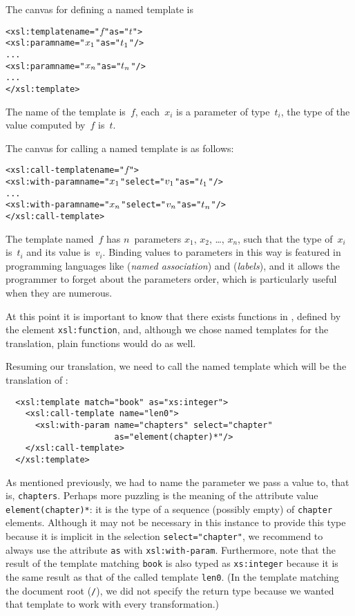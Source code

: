 The canvas for defining a named template is
\begin{alltt}
<xsl:template name="\(f\)" as="\(t\)">
  <xsl:param name="\(x\sb{1}\)" as="\(t\sb{1}\)"/>
  ...
  <xsl:param name="\(x\sb{n}\)" as="\(t\sb{n}\)"/>
  ...
</xsl:template>
\end{alltt}
The name of the template is~\(f\), each~\(x_i\) is a parameter of
type~\(t_i\), the type of the value computed by~\(f\) is~\(t\).

The canvas for calling a named template is as follows:
\begin{alltt}
<xsl:call-template name="\(f\)">
  <xsl:with-param name="\(x\sb{1}\)" select="\(v\sb{1}\)" as="\(t\sb{1}\)"/>
  ...
  <xsl:with-param name="\(x\sb{n}\)" select="\(v\sb{n}\)" as="\(t\sb{n}\)"/>
</xsl:call-template>
\end{alltt}
The template named~\(f\) has \(n\)~parameters \(x_1\), \(x_2\),
\ldots, \(x_n\), such that the type of~\(x_i\) is~\(t_i\) and its
value is~\(v_i\). Binding values to parameters in this way is featured
in programming languages like \Ada (\emph{named association}) and
\OCaml (\emph{labels}), and it allows the programmer to forget about
the parameters order, which is particularly useful when they are
numerous.

At this point it is important to know that there exists functions in
\XSLT, defined by the element \texttt{xsl:function}, and, although we
chose named templates for the translation, plain \XSLT functions would
do as well.

Resuming our translation, we need to call the named template which
will be the translation of :
\begin{verbatim}
  <xsl:template match="book" as="xs:integer">
    <xsl:call-template name="len0">
      <xsl:with-param name="chapters" select="chapter"
                      as="element(chapter)*"/>
    </xsl:call-template>
  </xsl:template>
\end{verbatim}
As mentioned previously, we had to name the parameter we pass a value
to, that is, \texttt{chapters}. Perhaps more puzzling is the meaning
of the attribute value \texttt{element(chapter)*}: it is the type of a
sequence (possibly empty) of \texttt{chapter} elements. Although it
may not be necessary in this instance to provide this type because it
is implicit in the selection \texttt{select="chapter"}, we recommend
to always use the attribute \texttt{as} with
\texttt{xsl:with-param}. Furthermore, note that the result of the
template matching \texttt{book} is also typed as \texttt{xs:integer}
because it is the same result as that of the called template
\texttt{len0}. (In the template matching the document root
(\texttt{/}), we did not specify the return type because we wanted
that template to work with every transformation.)

